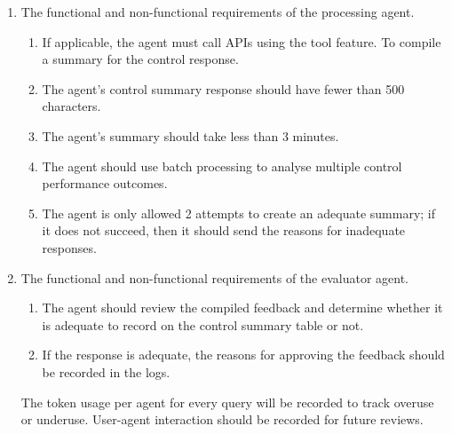 \documentclass{article}
\begin{document}
\begin{enumerate}
\begin{enumerate}
    \end{enumerate}
    \item The functional and non-functional requirements of the processing agent.
    \begin{enumerate}
        \item If applicable, the agent must call APIs using the tool feature. To compile a summary for the control response.
        \item The agent's control summary response should have fewer than 500 characters.
        \item The agent's summary should take less than 3 minutes.
        \item The agent should use batch processing to analyse multiple control performance outcomes.
        \item The agent is only allowed 2 attempts to create an adequate summary; if it does not succeed, then it should send the reasons for inadequate responses.
    \end{enumerate}
    \item The functional and non-functional requirements of the evaluator agent.
    \begin{enumerate}
        \item The agent should review the compiled feedback and determine whether it is adequate to record on the control summary table or not.
        \item If the response is adequate, the reasons for approving the feedback should be recorded in the logs.
    \end{enumerate}
The token usage per agent for every query will be recorded to track overuse or underuse. User-agent interaction should be recorded for future reviews. 
\end{enumerate}
\end{document}
